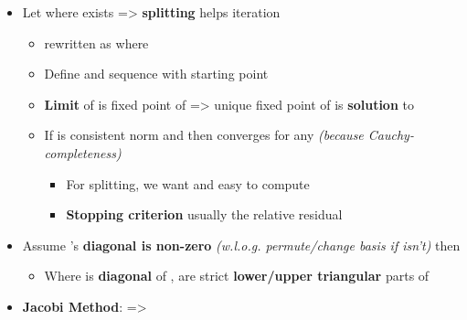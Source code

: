 \begin{itemize}

\item
  Let  where 
  exists =\textgreater{} \textbf{splitting}  helps
  iteration

  \begin{itemize}
  
  \item
     rewritten as
     where
  \item
    Define  and
    sequence
    with starting point 
  \item
    \textbf{Limit} of  is fixed
    point of  =\textgreater{} unique fixed point of 
    is \textbf{solution} to 
  \item
    If \iMbox{\lVert - \rVert} is consistent norm and
     then
     converges for any
     \emph{(because Cauchy-completeness)}

    \begin{itemize}
    
    \item
      For splitting, we want  and easy to
      compute 
    \item
      \textbf{Stopping criterion} usually the relative residual
    \end{itemize}
  \end{itemize}
\item
  Assume 's \textbf{diagonal is non-zero} \emph{(w.l.o.g.
  permute/change basis if isn't)} then 

  \begin{itemize}
  
  \item
    Where  is \textbf{diagonal} of ,  are
    strict \textbf{lower/upper triangular} parts of 
  \end{itemize}
\item
  \textbf{Jacobi Method}:  =\textgreater{}


\end{itemize}
